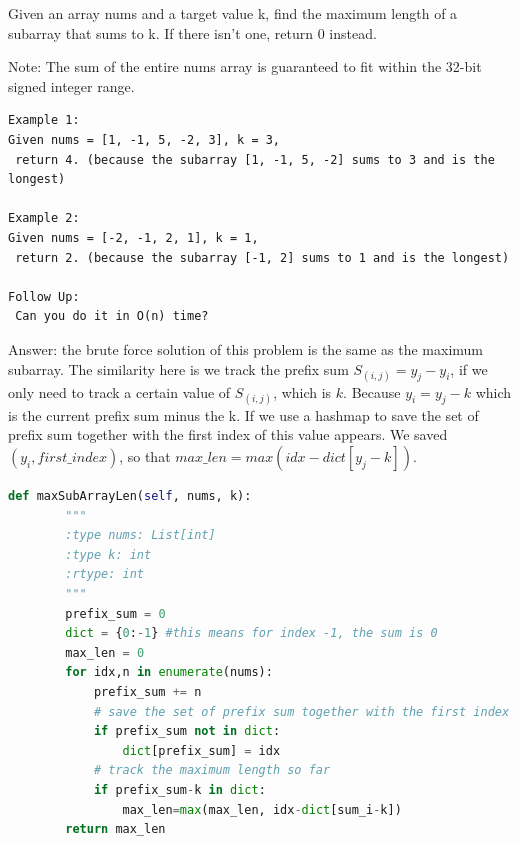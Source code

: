 \documentclass[../specific-algorithms.tex]{subfiles}
\begin{document}
Given an array nums and a target value k, find the maximum length of a subarray that sums to k. If there isn’t one, return 0 instead.

Note:
 The sum of the entire nums array is guaranteed to fit within the 32-bit signed integer range.

\begin{lstlisting}
Example 1:
Given nums = [1, -1, 5, -2, 3], k = 3,
 return 4. (because the subarray [1, -1, 5, -2] sums to 3 and is the longest)

Example 2:
Given nums = [-2, -1, 2, 1], k = 1,
 return 2. (because the subarray [-1, 2] sums to 1 and is the longest)

Follow Up:
 Can you do it in O(n) time?
 \end{lstlisting}
Answer: the brute force solution of this problem is the same as the maximum subarray. The similarity here is we track the prefix sum $S_{(i,j)} = y_j - y_i$, if we only need to track a certain value of $S_{(i,j)}$, which is $k$. Because $y_i = y_j - k$ which is the current prefix sum minus the k. If we use a hashmap to save the set of prefix sum together with the first index of this value appears. We saved $(y_i, first\_index)$, so that $max\_len = max(idx-dict[y_j-k])$. 
\begin{lstlisting}[language = Python]
def maxSubArrayLen(self, nums, k):
        """
        :type nums: List[int]
        :type k: int
        :rtype: int
        """
        prefix_sum = 0
        dict = {0:-1} #this means for index -1, the sum is 0
        max_len = 0
        for idx,n in enumerate(nums):
            prefix_sum += n
            # save the set of prefix sum together with the first index of this value appears. 
            if prefix_sum not in dict: 
                dict[prefix_sum] = idx
            # track the maximum length so far
            if prefix_sum-k in dict:
                max_len=max(max_len, idx-dict[sum_i-k])
        return max_len
\end{lstlisting}
\end{document}
